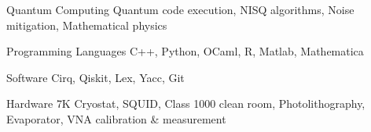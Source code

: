 

\begin{cvskills}

  \cvskill
    {Quantum Computing}
    {Quantum code execution, NISQ algorithms, Noise mitigation, Mathematical physics}%


  \cvskill
    {Programming Languages}
    {C++, Python, OCaml, R, Matlab, Mathematica}

  \cvskill
    {Software}
    {Cirq, Qiskit, Lex, Yacc, Git}

  \cvskill
    {Hardware}
    {7K Cryostat, SQUID, Class 1000 clean room, Photolithography, Evaporator, VNA calibration \& measurement}

\end{cvskills}
